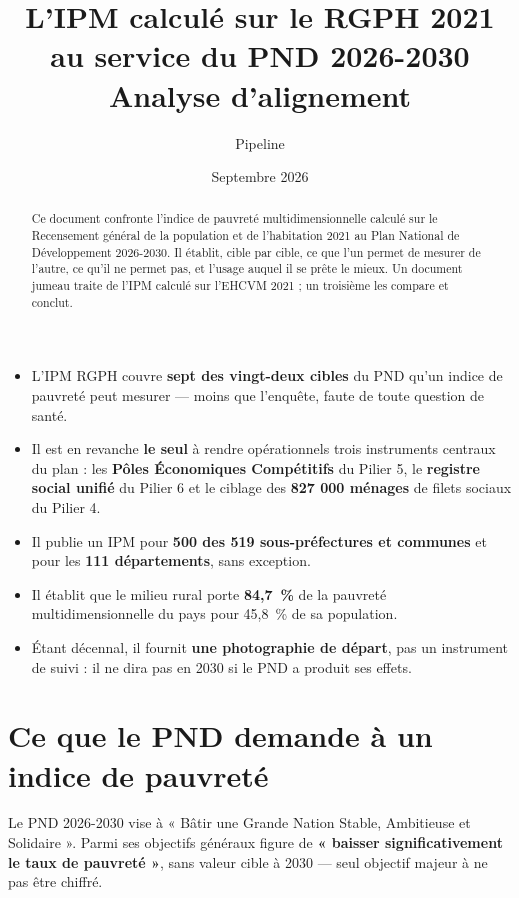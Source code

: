\documentclass[11pt,a4paper]{article}
\title{\bfseries L'IPM calculé sur le RGPH 2021 au service du PND 2026-2030\\[4pt]
\large Analyse d'alignement}
\author{Pipeline \col{PythonIPM}}
\date{Septembre 2026}
\begin{document}
\maketitle

\begin{abstract}
\noindent Ce document confronte l'indice de pauvreté multidimensionnelle calculé sur le
Recensement général de la population et de l'habitation 2021 au Plan National de Développement
2026-2030. Il établit, cible par cible, ce que l'un permet de mesurer de l'autre, ce qu'il ne
permet pas, et l'usage auquel il se prête le mieux. Un document jumeau traite de l'IPM calculé sur
l'EHCVM 2021 ; un troisième les compare et conclut.
\end{abstract}

\begin{retenir}
\begin{itemize}
  \item L'IPM RGPH couvre \textbf{sept des vingt-deux cibles} du PND qu'un indice de pauvreté peut
        mesurer --- moins que l'enquête, faute de toute question de santé.
  \item Il est en revanche \textbf{le seul} à rendre opérationnels trois instruments centraux du
        plan : les \textbf{Pôles Économiques Compétitifs} du Pilier 5, le \textbf{registre social
        unifié} du Pilier 6 et le ciblage des \textbf{827 000 ménages} de filets sociaux du
        Pilier 4.
  \item Il publie un IPM pour \textbf{500 des 519 sous-préfectures et communes} et pour les
        \textbf{111 départements}, sans exception.
  \item Il établit que le milieu rural porte \textbf{84,7~\%} de la pauvreté
        multidimensionnelle du pays pour 45,8~\% de sa population.
  \item Étant décennal, il fournit \textbf{une photographie de départ}, pas un instrument de
        suivi : il ne dira pas en 2030 si le PND a produit ses effets.
\end{itemize}
\end{retenir}

\tableofcontents
\bigskip

\section{Ce que le PND demande à un indice de pauvreté}

Le PND 2026-2030 vise à « Bâtir une Grande Nation Stable, Ambitieuse et Solidaire ». Parmi ses
objectifs généraux figure de \textbf{« baisser significativement le taux de pauvreté »}, sans
valeur cible à 2030 --- seul objectif majeur à ne pas être chiffré.
\end{document}
